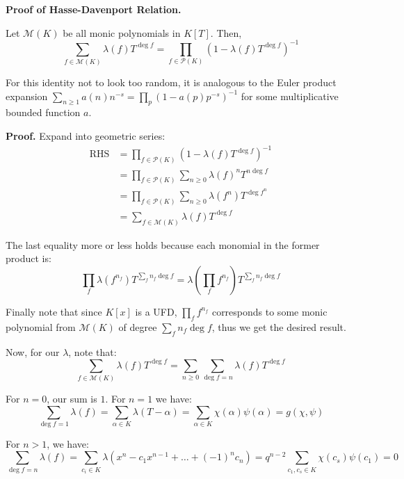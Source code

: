 \documentclass{template}
\begin{document}
\textbf{Proof of Hasse-Davenport Relation.}
\begin{proposition}
    Let $\mathcal{M}(K)$ be all monic polynomials in $K[T]$. Then,
    \[\sum_{f \in \mathcal{M}(K)} \lambda(f)T^{\deg f} = \prod_{f \in \mathcal{P}(K)}(1-\lambda(f)T^{\deg f})^{-1}\]
\end{proposition}

For this identity not to look too random, it is analogous to the Euler product
expansion $\sum_{n \geq 1} a(n)n^{-s} = \prod_{p}(1-a(p)p^{-s})^{-1}$ for some
multiplicative bounded function $a$.

\textbf{Proof.} Expand into geometric series:
\begin{align*}
    \text{RHS} &= \prod_{f \in \mathcal{P}(K)}(1-\lambda(f)T^{\deg f})^{-1} \\
    &=\prod_{f \in \mathcal{P}(K)}\sum_{n \geq 0} \lambda(f)^{n}T^{n\deg f} \\
    &=\prod_{f \in \mathcal{P}(K)}\sum_{n \geq 0} \lambda(f^n)T^{\deg f^n} \\
    &=\sum_{f \in \mathcal{M}(K)} \lambda(f)T^{\deg f}
\end{align*}

The last equality more or less holds because each monomial in the former product is:
\begin{equation*}
    \prod_{f} \lambda(f^{n_f})T^{\sum_fn_f\deg f} = \lambda\left(\prod_f f^{n_f} \right)T^{\sum_f n_f\deg f}
\end{equation*}

Finally note that since $K[x]$ is a UFD, $\prod_f f^{n_f}$ corresponds to some
monic polynomial from $\mathcal{M}(K)$ of degree $\sum_f n_f\deg f$, thus we get
the desired result.

Now, for our $\lambda$, note that:
\begin{equation*}
    \sum_{f \in \mathcal{M}(K)} \lambda(f)T^{\deg f} = \sum_{n \geq 0}\sum_{\deg f=n}\lambda(f)T^{\deg f} 
\end{equation*}

For $n=0$, our sum is $1$. For $n=1$ we have:
\begin{equation*}
    \sum_{\deg f=1}\lambda(f) = \sum_{\alpha \in K}\lambda(T-\alpha) = \sum_{\alpha \in K}\chi(\alpha)\psi(\alpha) = g(\chi,\psi)
\end{equation*}

For $n>1$, we have:
\begin{equation*}
    \sum_{\deg f = n}\lambda(f) = \sum_{c_i \in K}\lambda(x^n - c_1x^{n-1} + \dots + (-1)^nc_n) = q^{n-2}\sum_{c_1,c_s \in K} \chi(c_s)\psi(c_1) = 0
\end{equation*}
\end{document}
